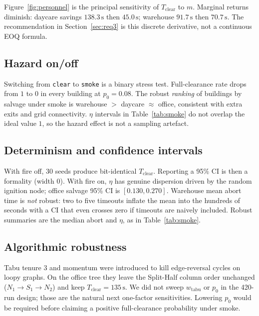 \documentclass[12pt]{article}
\newcommand{\Tclear}{T_{\mathrm{clear}}}
\begin{document}
Figure~\ref{fig:personnel} is the principal sensitivity of \(\Tclear\) to \(m\).
Marginal returns diminish: daycare savings \(138.3\,\mathrm{s}\) then
\(45.0\,\mathrm{s}\); warehouse \(91.7\,\mathrm{s}\) then \(70.7\,\mathrm{s}\).
The recommendation in Section~\ref{sec:req3} is this discrete derivative, not a
continuous EOQ formula.

\subsection{Hazard on/off}

Switching from \texttt{clear} to \texttt{smoke} is a binary stress test. Full-clearance
rate drops from \(1\) to \(0\) in every building at \(p_0=0.08\). The robust
\emph{ranking} of buildings by salvage under smoke is warehouse \(>\) daycare
\(\approx\) office, consistent with extra exits and grid connectivity. \(\eta\)
intervals in Table~\ref{tab:smoke} do not overlap the ideal value \(1\), so the
hazard effect is not a sampling artefact.

\subsection{Determinism and confidence intervals}

With fire off, 30 seeds produce bit-identical \(\Tclear\). Reporting a 95\% CI
is then a formality (width \(0\)). With fire on, \(\eta\) has genuine dispersion
driven by the random ignition node; office salvage 95\% CI is
\([0.130,0.270]\). Warehouse mean abort time is \emph{not} robust: two to five
timeouts inflate the mean into the hundreds of seconds with a CI that even
crosses zero if timeouts are naively included. Robust summaries are the median
abort and \(\eta\), as in Table~\ref{tab:smoke}.

\subsection{Algorithmic robustness}

Tabu tenure \(3\) and momentum were introduced to kill edge-reversal cycles on
loopy graphs. On the office tree they leave the Split-Half column order unchanged
(\(N_1\to S_1\to N_2\)) and keep \(\Tclear=135\,\mathrm{s}\). We did not sweep
\(w_{\mathrm{tabu}}\) or \(p_0\) in the 420-run design; those are the natural next
one-factor sensitivities. Lowering \(p_0\) would be required before claiming a
positive full-clearance probability under smoke.
\end{document}
